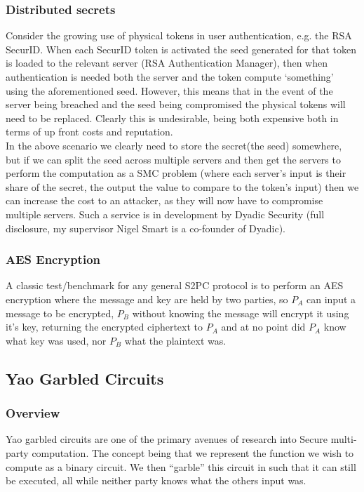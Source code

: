 \documentclass[a4paper,10pt]{article}
\begin{document}
      \subsubsection{Distributed secrets} \label{DistributedSecretApplication}
		Consider the growing use of physical tokens in user authentication, e.g. the RSA SecurID. When each SecurID token is activated the seed generated for that token is loaded to the relevant server (RSA Authentication Manager), then when authentication is needed both the server and the token compute `something' using the aforementioned seed. However, this means that in the event of the server being breached and the seed being compromised the physical tokens will need to be replaced. Clearly this is undesirable, being both expensive both in terms of up front costs and reputation.\\

		In the above scenario we clearly need to store the secret(the seed) somewhere, but if we can split the seed across multiple servers and then get the servers to perform the computation as a SMC problem (where each server's input is their share of the secret, the output the value to compare to the token's input) then we can increase the cost to an attacker, as they will now have to compromise multiple servers. Such a service is in development by Dyadic Security (full disclosure, my supervisor Nigel Smart is a co-founder of Dyadic).

      \subsubsection{AES Encryption} \label{AES_Application}
		A classic test/benchmark for any general S2PC protocol is to perform an AES encryption where the message and key are held by two parties, so $P_A$ can input a message to be encrypted, $P_B$ without knowing the message will encrypt it using it's key, returning the encrypted ciphertext to $P_A$ and at no point did $P_A$ know what key was used, nor $P_B$ what the plaintext was.

    
    \subsection{Yao Garbled Circuits} \label{Yao_Circuits}

	\subsubsection{Overview} \label{Yao_Overview}
		Yao garbled circuits are one of the primary avenues of research into Secure multi-party computation. The concept being that we represent the function we wish to compute as a binary circuit. We then ``garble'' this circuit in such that it can still be executed, all while neither party knows what the others input was.
\end{document}

